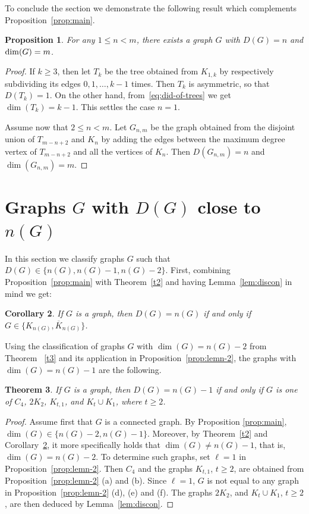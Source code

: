 \documentclass[12pt]{article}
\newtheorem{theorem}{Theorem}[section]
\newtheorem{corollary}[theorem]{Corollary}
\newtheorem{proposition}[theorem]{Proposition}
\begin{document}
To conclude the section we demonstrate the following result which complements Proposition~\ref{prop:main}. 

\begin{proposition}\label{w}
For any $1\leq n< m$, there exists a graph $G$ with $D(G)=n$ and ${\rm dim}(G)=m$.
\end{proposition} 

\begin{proof}
If $k\geq 3$, then let $T_k$ be the tree obtained from $K_{1,k}$ by respectively subdividing its edges $0,1,\ldots, k-1$ times. Then $T_k$ is asymmetric, so that $D(T_k) = 1$. On the other hand, from~\eqref{eq:did-of-trees} we get $\dim(T_k) = k-1$. This settles the case $n = 1$. 

Assume now that $2\leq n < m$. Let $G_{n,m}$ be the graph obtained from the disjoint union of $T_{m-n+2}$ and $K_n$ by adding the edges between the maximum degree vertex of $T_{m-n+2}$ and all the vertices of $K_n$. Then $D(G_{n,m})=n$ and $\dim(G_{n,m})=m$. 
\end{proof} 

\section{Graphs $G$ with $D(G)$ close to $n(G)$} 
\label{sec:large-D}

In this section we classify graphs $G$ such that $D(G) \in \{n(G), n(G)-1, n(G)-2\}$. First, combining Proposition~\ref{prop:main} with Theorem~\ref{t2} and having Lemma~\ref{lem:discon} in mind we get: 

\begin{corollary}\label{cor:r1}
If $G$ is a graph, then $D(G) = n(G)$ if and only if $G \in \{K_{n(G)}, \overline{K}_{n(G)} \}$.
\end{corollary} 

Using the classification of graphs $G$ with $\dim(G) = n(G) - 2$ from Theorem~
\ref{t3} and its application in Proposition~\ref{prop:lemn-2}, the graphs with $\dim(G) = n(G) - 1$ are the following.

\begin{theorem}\label{then-2}
If $G$ is a graph, then $D(G) = n(G) - 1$ if and only if $G$ is one of $C_4$, 
$2K_{2}$, $K_{t, 1}$, and $K_{t}\cup K_1$, where $t\geq 2$.
\end{theorem}

\begin{proof} 
Assume first that $G$ is a connected graph. By Proposition \ref{prop:main}, $\dim(G) \in \{n(G)-2, n(G)-1\}$. Moreover, by Theorem~\ref{t2} and Corollary~\ref{cor:r1}, it more specifically holds that $\dim(G) \neq n(G)-1$, that is, $\dim(G)= n(G)-2$. To determine such graphs, set $\ell=1$ in Proposition~\ref{prop:lemn-2}. Then $C_4$ and the graphs $K_{t, 1}$, $t\geq 2$, are obtained from Proposition~\ref{prop:lemn-2} (a) and (b). Since $\ell =1$, $G$ is not equal to any graph in Proposition~\ref{prop:lemn-2} (d), (e) and (f). The graphs $2K_{2}$, and $K_{t}\cup K_1$, $t\geq 2$, are then deduced by Lemma~\ref{lem:discon}. 
\end{proof} 
\end{document}
